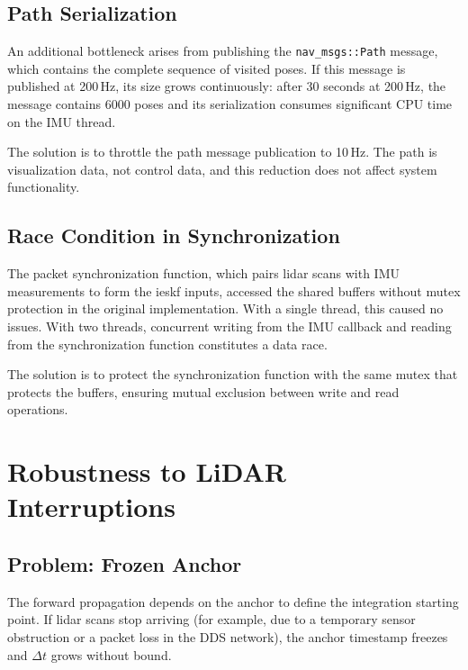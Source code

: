 \subsection{Path Serialization}
\label{sec:fr-path}

An additional bottleneck arises from publishing the \texttt{nav\_msgs::Path}
message, which contains the complete sequence of visited poses. If this message is
published at 200\,Hz, its size grows continuously: after 30 seconds at 200\,Hz, the
message contains 6000 poses and its serialization consumes significant CPU time on
the IMU thread.

The solution is to throttle the path message publication to 10\,Hz. The path is
visualization data, not control data, and this reduction does not affect system
functionality.

\subsection{Race Condition in Synchronization}
\label{sec:fr-sync-race}

The packet synchronization function, which pairs \gls{lidar} scans with IMU
measurements to form the \gls{ieskf} inputs, accessed the shared buffers without
mutex protection in the original implementation. With a single thread, this caused
no issues. With two threads, concurrent writing from the IMU callback and reading
from the synchronization function constitutes a data race.

The solution is to protect the synchronization function with the same mutex that
protects the buffers, ensuring mutual exclusion between write and read operations.

\section{Robustness to LiDAR Interruptions}
\label{sec:fr-stale-anchor}

\subsection{Problem: Frozen Anchor}
\label{sec:fr-frozen-anchor}

The forward propagation depends on the anchor to define the integration starting
point. If \gls{lidar} scans stop arriving (for example, due to a temporary sensor
obstruction or a packet loss in the DDS network), the anchor timestamp freezes and
$\Delta t$ grows without bound.

